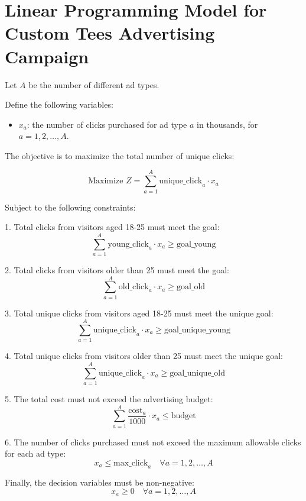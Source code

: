 \documentclass{article}
\begin{document}
\section*{Linear Programming Model for Custom Tees Advertising Campaign}

Let \( A \) be the number of different ad types. 

Define the following variables:
\begin{itemize}
    \item \( x_a \): the number of clicks purchased for ad type \( a \) in thousands, for \( a = 1, 2, \ldots, A \).
\end{itemize}

The objective is to maximize the total number of unique clicks:

\[
\text{Maximize } Z = \sum_{a=1}^{A} \text{unique\_click}_{a} \cdot x_a
\]

Subject to the following constraints:

1. Total clicks from visitors aged 18-25 must meet the goal:
\[
\sum_{a=1}^{A} \text{young\_click}_{a} \cdot x_a \geq \text{goal\_young}
\]

2. Total clicks from visitors older than 25 must meet the goal:
\[
\sum_{a=1}^{A} \text{old\_click}_{a} \cdot x_a \geq \text{goal\_old}
\]

3. Total unique clicks from visitors aged 18-25 must meet the unique goal:
\[
\sum_{a=1}^{A} \text{unique\_click}_{a} \cdot x_a \geq \text{goal\_unique\_young}
\]

4. Total unique clicks from visitors older than 25 must meet the unique goal:
\[
\sum_{a=1}^{A} \text{unique\_click}_{a} \cdot x_a \geq \text{goal\_unique\_old}
\]

5. The total cost must not exceed the advertising budget:
\[
\sum_{a=1}^{A} \frac{\text{cost}_{a}}{1000} \cdot x_a \leq \text{budget}
\]

6. The number of clicks purchased must not exceed the maximum allowable clicks for each ad type:
\[
x_a \leq \text{max\_click}_{a} \quad \forall a = 1, 2, \ldots, A
\]

Finally, the decision variables must be non-negative:
\[
x_a \geq 0 \quad \forall a = 1, 2, \ldots, A
\]
\end{document}
